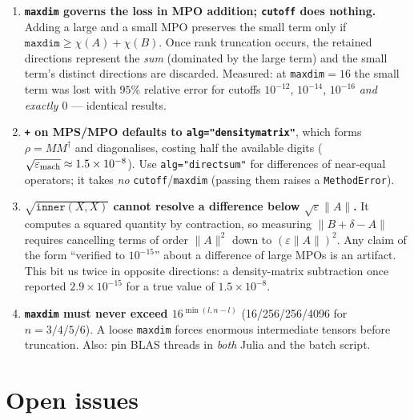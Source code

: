 \documentclass[11pt,a4paper]{article}
\begin{document}
\begin{enumerate}
\item\textbf{\texttt{maxdim} governs the loss in MPO addition; \texttt{cutoff} does nothing.}
Adding a large and a small MPO preserves the small term only if
$\texttt{maxdim}\ge\chi(A)+\chi(B)$. Once rank truncation occurs, the retained directions
represent the \emph{sum} (dominated by the large term) and the small term's distinct directions
are discarded. Measured: at \texttt{maxdim}$=16$ the small term was lost with $95\%$ relative
error for cutoffs $10^{-12}$, $10^{-14}$, $10^{-16}$ \emph{and exactly $0$} --- identical
results.

\item\textbf{\texttt{+} on MPS/MPO defaults to \texttt{alg="densitymatrix"}}, which forms
$\rho=MM^\dagger$ and diagonalises, costing half the available digits
($\sqrt{\varepsilon_{\rm mach}}\approx1.5\times10^{-8}$). Use \texttt{alg="directsum"} for
differences of near-equal operators; it takes \emph{no} \texttt{cutoff}/\texttt{maxdim}
(passing them raises a \texttt{MethodError}).

\item\textbf{$\sqrt{\texttt{inner}(X,X)}$ cannot resolve a difference below
$\sqrt{\varepsilon}\|A\|$.} It computes a squared quantity by contraction, so measuring
$\|B+\delta-A\|$ requires cancelling terms of order $\|A\|^2$ down to $(\varepsilon\|A\|)^2$.
Any claim of the form ``verified to $10^{-15}$'' about a difference of large MPOs is an
artifact. This bit us twice in opposite directions: a density-matrix subtraction once reported
$2.9\times10^{-15}$ for a true value of $1.5\times10^{-8}$.

\item\textbf{\texttt{maxdim} must never exceed $16^{\min(l,n-l)}$} (16/256/256/4096 for
$n=3/4/5/6$). A loose \texttt{maxdim} forces enormous intermediate tensors before truncation.
Also: pin BLAS threads in \emph{both} Julia and the batch script.
\end{enumerate}

\section{Open issues}
\end{document}

